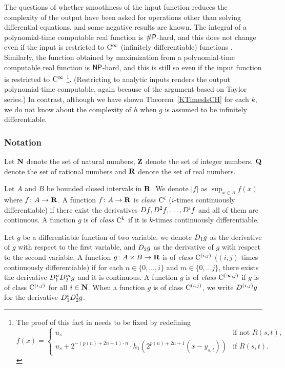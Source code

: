 The questions of whether smoothness of the input function 
reduces the complexity of the output
have been asked for operations other than solving differential equations, 
and some negative results are known. 
The integral of a polynomial-time computable real function 
is $\mathsf{\#P}$-hard, and this does not change 
even if the input is restricted to 
$\mathrm C ^\infty$ (infinitely differentiable) functions
\cite[Theorem~5.33]{ko1991complexity}. 
Similarly, the function obtained by maximization 
from a polynomial-time computable real function 
is $\mathsf{NP}$-hard, and this is still so
even if the input function is restricted to $\mathrm C ^\infty$ 
\cite[Theorem~3.7]{ko1991complexity}%
\footnote{%
The proof of this fact in \cite[Theorem 3.7]{ko1991complexity}
needs to be fixed by redefining 
\[f(x) = 
\begin{cases}
 u_s & \text{if not } R(s,t), \\
 u_s + 2^{-(p(n)+2n+1)\cdot n} \cdot h_1(2^{p(n)+2n+1} (x - y_{s,t})) & \text{if } R(s,t). 
\end{cases}\]
}. 
(Restricting to analytic inputs 
renders the output polynomial-time computable, 
again because of the argument based on Taylor series.)
In contrast, 
although we have shown Theorem~\ref{KTimesIsCH} for each $k$, 
we do not know about the complexity of 
$h$ when $g$ is assumed to be infinitely differentiable. 

\subsubsection*{Notation}
Let $\mathbf N$ denote the set of natural numbers,
$\mathbf Z$ denote the set of integer numbers,
$\mathbf Q$ denote the set of rational numbers 
and $\mathbf R$ denote the set of real numbers.

Let $A$ and $B$ be bounded closed intervals in $\mathbf R$.
We denote $|f|$ as $\sup_{x \in A} f(x)$ where $f \colon A \to \mathbf R$.
A function $f \colon A \to \mathbf R$ is \emph{class $\mathrm C^i$}
($i$-times continuously differentiable)
if there exist the derivatives $D f, D^2 f, \dots, D^i f$ and all of them are continuous.
A function $g$ is of \emph{class $\mathrm C^k$} if it is $k$-times continuously differentiable.

Let $g$ be a differentiable function of two variable,
we denote $D_1 g$ as the derivative of $g$ with respect to the first variable,
and $D_2 g$ as the derivative of $g$ with respect to the second variable.
A function $g \colon A \times B \to \mathbf R$ is of \emph{class $\mathrm C^{(i, j)}$}
($(i, j)$-times continuously  differentiable)
if for each $n \in \{0, \dots, i\}$ and $m \in \{0, \dots j\}$,
there exists the derivative $D_1^n D_2^m g$ and it is continuous.
A function $g$ is of \emph{class $\mathrm C^{(\infty, j)}$}
if $g$ is of class $\mathrm C^{(i, j)}$ for all $i \in \mathbf N$.
When a function $g$ is of class $\mathrm C^{(i,j)}$,
we write $D^{(i,j)}g$ for the derivative $D_1^i D_2^j g$.
